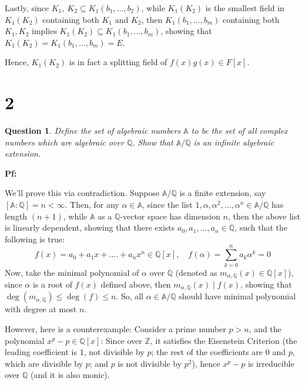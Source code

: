 \documentclass{article}
\newtheorem{question}{Question}
\begin{document}
Lastly, since $K_1,\ K_2\subseteq K_1(b_1,...,b_2)$, while $K_1(K_2)$ is the smallest field in $K_1(K_2)$ containing both $K_1$ and $K_2$, then $K_1(b_1,...,b_m)$ containing both $K_1,K_2$ implies $K_1(K_2)\subseteq K_1(b_1,...,b_m)$,
showing that $K_1(K_2)=K_1(b_1,...,b_m)=E$.

Hence, $K_1(K_2)$ is in fact a splitting field of $f(x)g(x)\in F[x]$.

\break

\section*{2}
\begin{myBox}[]{}
    \begin{question}
        Define the set of algebraic numbers $\mathbb{A}$ to be the set of all complex numbers which are
        algebraic over $\mathbb{Q}$. Show that $\mathbb{A}/\mathbb{Q}$ is an infinite algebraic extension.
    \end{question}
\end{myBox}

\textbf{Pf:}

We'll prove this via contradiction. Suppose $\mathbb{A}/\mathbb{Q}$ is a finite extension, say $[\mathbb{A}:\mathbb{Q}]=n<\infty$.
Then, for any $\alpha\in\mathbb{A}$, since the list $1,\alpha,\alpha^2,...,\alpha^n\in\mathbb{A}/\mathbb{Q}$ has length $(n+1)$, while $\mathbb{A}$ as a $\mathbb{Q}$-vector space
has dimension $n$, then the above list is linearly dependent, showing that there exists $a_0,a_1,...,a_n\in\mathbb{Q}$, such that the following is true:
$$f(x)=a_0+a_1x+....+a_nx^n\in\mathbb{Q}[x],\quad f(\alpha)=\sum_{k=0}^{n}a_k\alpha^k=0$$
Now, take the minimal polynomial of $\alpha$ over $\mathbb{Q}$ (denoted as $m_{\alpha,\mathbb{Q}}(x)\in\mathbb{Q}[x]$), since $\alpha$ is a root of $f(x)$ defined above,
then $m_{\alpha,\mathbb{Q}}(x)\mid f(x)$, showing that $\deg(m_{\alpha,\mathbb{Q}})\leq \deg(f)\leq n$. So, all $\alpha\in\mathbb{A}/\mathbb{Q}$ should have minimal polynomial with degree at most $n$.

\hfil

However, here is a counterexample: Consider a prime number $p>n$, and the polynomial $x^p-p\in\mathbb{Q}[x]$:
Since over $\mathbb{Z}$, it satisfies the Eisenstein Criterion (the leading coefficient is $1$, not divisible by $p$; the rest of the coefficients are $0$ and $p$, which are divisible by $p$; and $p$ is not divisible by $p^2$),
hence $x^p-p$ is irreducible over $\mathbb{Q}$ (and it is also monic).
\end{document}
